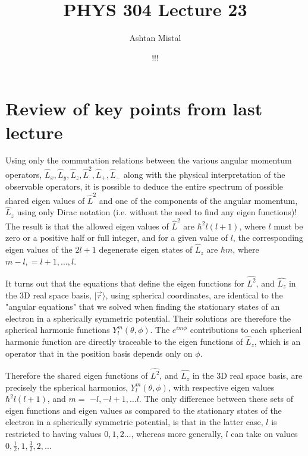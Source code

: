 \documentclass{article}
\title{PHYS 304 Lecture 23}
\author{Ashtan Mistal}
\date{!!!}
\begin{document}
\ifstandalone
\maketitle
\fi

\graphicspath{{./Lecture23/}}

\section{Review of key points from last lecture}


Using only the commutation relations between the various angular momentum operators, $\hat{L}_x, \hat{L}_y, \hat{L}_z, \hat{L}^2, \hat{L}_+, \hat{L}_-$ along with the physical interpretation of the observable operators, it is possible to deduce the entire spectrum of possible shared eigen values of $\hat{L}^2$  and one of the components of the angular momentum,  $\hat{L}_z$ using only Dirac notation (i.e. without the need to find any eigen functions)!  
The result is that the allowed eigen values of $\hat{L}^2$ are $\hbar^2 l (l+1)$, where $l$ must be zero or a positive half or full integer, and for a given value of $l$, the corresponding eigen values of the $2l+1$ degenerate eigen states of $\hat{L}_z$ are $\hbar m$, where $m  -l, =l+1,...,l$. 


It turns out that the equations that define the eigen functions for $\widehat{L^{2}}$, and $\widehat{L_{z}}$ in the 3D real space basis, $|\vec{r}\rangle$, using spherical coordinates, are identical to the "angular equations" that we solved when finding the stationary states of an electron in a spherically symmetric potential. Their solutions are therefore the spherical harmonic functions $Y_{l}^{m}(\theta, \phi)$. The $e^{i m \phi}$ contributions to each spherical harmonic function are directly traceable to the eigen functions of $\widehat{L}_{z}$, which is an operator that in the position basis depends only on $\phi .$

Therefore the shared eigen functions of $\hat{L^{2}}$, and $\hat{L_{z}}$ in the 3D real space basis, are precisely the spherical harmonics, $Y_{l}^{m}(\theta, \phi)$, with respective eigen values $\hbar^{2} l(l+1)$, and $m=$ $-l,-l+1, \ldots l$. The only difference between these sets of eigen functions and eigen values as compared to the stationary states of the electron in a spherically symmetric potential, is that in the latter case, $l$ is restricted to having values $0,1,2 \ldots$, whereas more generally, $l$ can take on values $0, \frac{1}{2}, 1, \frac{3}{2}, 2, \ldots$
\end{document}
